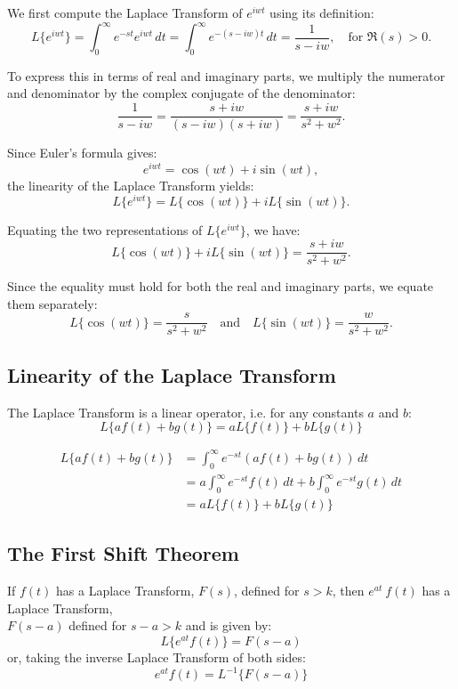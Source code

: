 \documentclass[a4paper, 10pt]{article}
\begin{document}
\begin{examplebox}
  We first compute the Laplace Transform of $e^{iwt}$ using its definition:
  \[
    L\{e^{iwt}\} = \int_0^\infty e^{-st}e^{iwt}\,dt
    = \int_0^\infty e^{-(s-iw)t}\,dt
    = \frac{1}{s-iw}, \quad \text{for } \Re(s) > 0.
  \]

  To express this in terms of real and imaginary parts, we multiply the numerator and denominator by the complex conjugate of the denominator:
  \[
    \frac{1}{s-iw} = \frac{s+iw}{(s-iw)(s+iw)} = \frac{s+iw}{s^2 + w^2}.
  \]

  Since Euler's formula gives:
  \[
    e^{iwt} = \cos(wt) + i\sin(wt),
  \]
  the linearity of the Laplace Transform yields:
  \[
    L\{e^{iwt}\} = L\{\cos(wt)\} + iL\{\sin(wt)\}.
  \]

  Equating the two representations of $L\{e^{iwt}\}$, we have:
  \[
    L\{\cos(wt)\} + iL\{\sin(wt)\} = \frac{s+iw}{s^2+w^2}.
  \]

  Since the equality must hold for both the real and imaginary parts, we equate them separately:
  \[
    L\{\cos(wt)\} = \frac{s}{s^2+w^2} \quad \text{and} \quad L\{\sin(wt)\} = \frac{w}{s^2+w^2}.
  \]
\end{examplebox}

\subsection{Linearity of the Laplace Transform}
The Laplace Transform is a linear operator, i.e. for any constants $a$ and $b$:
$$L\{af(t) + bg(t)\} = aL\{f(t)\} + bL\{g(t)\}$$
\begin{proofbox}
  \begin{align*}
    L\{af(t) + bg(t)\}
     & = \int_0^\infty e^{-st}(af(t) + bg(t))\, dt                         \\
     & = a\int_0^\infty e^{-st}f(t)\, dt + b\int_0^\infty e^{-st}g(t)\, dt \\
     & = aL\{f(t)\} + bL\{g(t)\}
  \end{align*}
\end{proofbox}

\subsection{The First Shift Theorem}
\begin{theorembox}
  If $f(t)$ has a Laplace Transform, $F(s)$, defined for $s > k$, then $e^{at}\ f(t)$ has a Laplace Transform, \\ $F(s-a)$ defined for $s - a > k$ and is given by:
  $$L\{e^{at} f(t)\} = F(s-a)$$
  or, taking the inverse Laplace Transform of both sides:
  $$e^{at}f(t) = L^{-1}\{F(s-a)\}$$
\end{theorembox}
\end{document}
